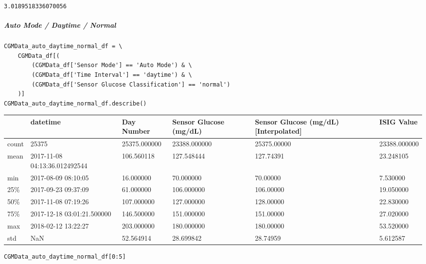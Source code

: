 \begin{verbatim}
3.0189518336070056
\end{verbatim}

\subparagraph{Auto Mode / Daytime / Normal}

\begin{verbatim}
CGMData_auto_daytime_normal_df = \
    CGMData_df[(
        (CGMData_df['Sensor Mode'] == 'Auto Mode') & \
        (CGMData_df['Time Interval'] == 'daytime') & \
        (CGMData_df['Sensor Glucose Classification'] == 'normal')
    )]
CGMData_auto_daytime_normal_df.describe()
\end{verbatim}

\bigskip\noindent
\begin{tabular}{p{}p{}p{}p{}p{}p{}}
\toprule
 & datetime & Day Number & Sensor Glucose (mg/dL) & Sensor Glucose (mg/dL) [Interpolated] & ISIG Value \\
\hline
count & 25375 & 25375.000000 & 23388.000000 & 25375.00000 & 23388.000000 \\
\hline
mean & 2017-11-08 04:13:36.012492544 & 106.560118 & 127.548444 & 127.74391 & 23.248105 \\
\hline
min & 2017-08-09 08:10:05 & 16.000000 & 70.000000 & 70.00000 & 7.530000 \\
\hline
25\% & 2017-09-23 09:37:09 & 61.000000 & 106.000000 & 106.00000 & 19.050000 \\
\hline
50\% & 2017-11-08 07:19:26 & 107.000000 & 127.000000 & 128.00000 & 22.830000 \\
\hline
75\% & 2017-12-18 03:01:21.500000 & 146.500000 & 151.000000 & 151.00000 & 27.020000 \\
\hline
max & 2018-02-12 13:22:27 & 203.000000 & 180.000000 & 180.00000 & 53.520000 \\
\hline
std & NaN & 52.564914 & 28.699842 & 28.74959 & 5.612587 \\
\hline
\bottomrule
\end{tabular}

\bigskip

\begin{verbatim}
CGMData_auto_daytime_normal_df[0:5]
\end{verbatim}

